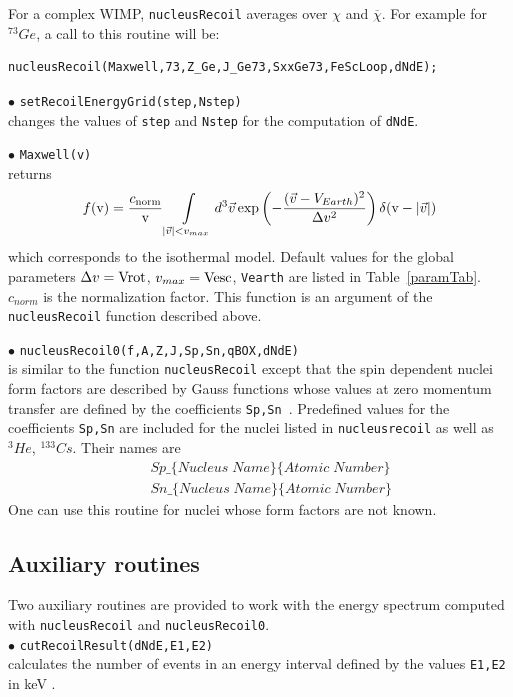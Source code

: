 \documentclass[12pt,a4paper]{article}
\begin{document}
For a complex WIMP, \verb|nucleusRecoil| averages over $\chi$ and
$\overline{\chi}$. For example for $^{73}Ge$, a call to this routine will be: 
\begin{verbatim}
nucleusRecoil(Maxwell,73,Z_Ge,J_Ge73,SxxGe73,FeScLoop,dNdE);
\end{verbatim}


\noindent
$\bullet$ \verb|setRecoilEnergyGrid(step,Nstep)| \\
changes the values of \verb|step| and \verb|Nstep| for the computation of \verb|dNdE|.


\noindent
$\bullet$ \verb|Maxwell(v)| \\
returns   
$$f(\mbox{v})= \frac{c_{\rm{norm}}}{\mbox{v}}\int\limits_{|\vec{v}|<v_{max}} d^3\vec{v} \exp\left(
-\frac{(\vec{v}-V_{Earth})^2}{\Delta v^2}\right)\delta(\mbox{v} -|\vec{v}|)
$$
which corresponds to the isothermal model. Default values for the global parameters 
$\Delta v ={\rm Vrot}$,  $v_{max}={\rm Vesc}$, \verb|Vearth| are listed in Table~\ref{paramTab}.
$c_{norm}$ is the normalization factor.  This function is an
argument of the \verb|nucleusRecoil| function described above.


\noindent
$\bullet$ \verb|nucleusRecoil0(f,A,Z,J,Sp,Sn,qBOX,dNdE)|\\
is similar to the  function \verb|nucleusRecoil| except that 
the spin dependent nuclei form factors are described by Gauss functions
whose values  at zero momentum transfer are defined by the coefficients \verb|Sp,Sn|~\cite{Belanger:2008sj}. 
Predefined values for the coefficients \verb|Sp,Sn| are included for the
nuclei listed in \verb|nucleusrecoil| as well as ${}^3He$, ${}^{133}Cs$. Their  names are 
\begin{eqnarray}
    &&Sp\_\{Nucleus\; Name\}\{Atomic \;Number\} \nonumber\\
    &&Sn\_\{Nucleus\; Name\}\{Atomic\; Number\} \nonumber
\end{eqnarray}
One can use this routine for nuclei whose form factors  are not known. 



\subsection{Auxiliary routines}
Two auxiliary routines are provided to work with the energy
spectrum computed with
\verb|nucleusRecoil| and  \verb|nucleusRecoil0|.\\
%
\noindent
$\bullet$ \verb|cutRecoilResult(dNdE,E1,E2)|\\
calculates the number of events in an energy interval defined by the
values \verb|E1,E2| in keV .
\end{document}
